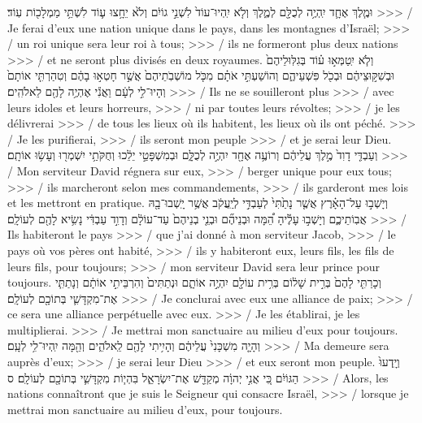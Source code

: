 \begin{paracol}[1]
{    וּמֶ֧לֶךְ אֶחָ֛ד יִֽהְיֶ֥ה לְכֻלָּ֖ם לְמֶ֑לֶךְ
    וְלֹ֤א יִֽהְיוּ־עוֹד֙ לִשְׁנֵ֣י גוֹיִ֔ם
    וְלֹ֙א יֵחָ֥צוּ ע֛וֹד לִשְׁתֵּ֥י מַמְלָכ֖וֹת עֽוֹד׃}
  {>>> / Je ferai d’eux une nation unique dans le pays, dans les montagnes d’Israël;
    >>> / un roi unique sera leur roi à tous;
    >>> / ils ne formeront plus deux nations
    >>> / et ne seront plus divisés en deux royaumes.}
  \clearpage
  \verset
  {וְלֹ֧א יִֽטַמְּא֣וּ ע֗וֹד
    בְּגִלּֽוּלֵיהֶם֙ וּבְשִׁקּ֣וּצֵיהֶ֔ם
    וּבְכֹ֖ל פִּשְׁעֵיהֶ֑ם
    וְהוֹשַׁעְתִּ֣י אֹתָ֗ם
    מִכֹּ֤ל מוֹשְׁבֹֽתֵיהֶם֙ אֲשֶׁ֣ר חָטְא֣וּ בָהֶ֔ם
    וְטִהַרְתִּ֤י אוֹתָם֙
    וְהָיוּ־לִ֣י לְעָ֔ם
    וַאֲנִ֕י אֶהְיֶ֥ה לָהֶ֖ם לֵאלֹהִֽים׃}
  {>>> / Ils ne se souilleront plus
    >>> / avec leurs idoles et leurs horreurs,
    >>> / ni par toutes leurs révoltes;
    >>> / je les délivrerai
    >>> / de tous les lieux où ils habitent, les lieux où ils ont péché.
    >>> / Je les purifierai,
    >>> / ils seront mon peuple
    >>> / et je serai leur Dieu.}
  \verset
  {וְעַבְדִּ֤י דָוִד֙ מֶ֣לֶךְ עֲלֵיהֶ֔ם
    וְרוֹעֶ֥ה אֶחָ֖ד יִהְיֶ֣ה לְכֻלָּ֑ם
    וּבְמִשְׁפָּטַ֣י יֵלֵ֔כוּ
    וְחֻקֹּתַ֥י יִשְׁמְר֖וּ וְעָשׂ֥וּ אוֹתָֽם׃}
  {>>> / Mon serviteur David régnera sur eux,
    >>> / berger unique pour eux tous;
    >>> / ils marcheront selon mes commandements,
    >>> / ils garderont mes lois et les mettront en pratique.}
  \verset
  {וְיָשְׁב֣וּ עַל־הָאָ֗רֶץ
    אֲשֶׁ֤ר נָתַ֙תִּי֙ לְעַבְדִּ֣י לְיַֽעֲקֹ֔ב
    אֲשֶׁ֥ר יָֽשְׁבוּ־בָ֖הּ אֲבֽוֹתֵיכֶ֑ם
    וְיָשְׁב֣וּ עָלֶ֡יהָ הֵ֠מָּה וּבְנֵיהֶ֞ם וּבְנֵ֤י בְנֵיהֶם֙ עַד־עוֹלָ֔ם
    וְדָוִ֣ד עַבְדִּ֔י נָשִׂ֥יא לָהֶ֖ם לְעוֹלָֽם׃}
  {>>> / Ils habiteront le pays
    >>> / que j’ai donné à mon serviteur Jacob,
    >>> / le pays où vos pères ont habité,
    >>> / ils y habiteront eux, leurs fils, les fils de leurs fils, pour toujours;
    >>> / mon serviteur David sera leur prince pour toujours.}
  \verset
  {וְכָרַתִּ֤י לָהֶם֙ בְּרִ֣ית שָׁל֔וֹם
    בְּרִ֥ית עוֹלָ֖ם יִהְיֶ֣ה אוֹתָ֑ם
    וּנְתַתִּים֙ וְהִרְבֵּיתִ֣י אוֹתָ֔ם
    וְנָתַתִּ֧י אֶת־מִקְדָּשִׁ֛י בְּתוֹכָ֖ם לְעוֹלָֽם׃}
  {>>> / Je conclurai avec eux une alliance de paix;
    >>> / ce sera une alliance perpétuelle avec eux.
    >>> / Je les établirai, je les multiplierai.
    >>> / Je mettrai mon sanctuaire au milieu d’eux pour toujours.}
  \verset
  {וְהָיָ֤ה מִשְׁכָּנִי֙ עֲלֵיהֶ֔ם
    וְהָיִ֥יתִי לָהֶ֖ם לֵֽאלֹהִ֑ים
    וְהֵ֖מָּה יִֽהְיוּ־לִ֥י לְעָֽם׃}
  {>>> / Ma demeure sera auprès d’eux;
    >>> / je serai leur Dieu
    >>> / et eux seront mon peuple.}
  \verset
  {וְיָֽדְעוּ֙ הַגּוֹיִ֔ם כִּ֚י אֲנִ֣י יְהוָ֔ה מְקַדֵּ֖שׁ אֶת־יִשְׂרָאֵ֑ל
    בִּהְי֧וֹת מִקְדָּשִׁ֛י בְּתוֹכָ֖ם לְעוֹלָֽם׃ ס}
  {>>> / Alors, les nations connaîtront que je suis le Seigneur qui consacre Israël,
    >>> / lorsque je mettrai mon sanctuaire au milieu d’eux, pour toujours.}
\end{paracol}
